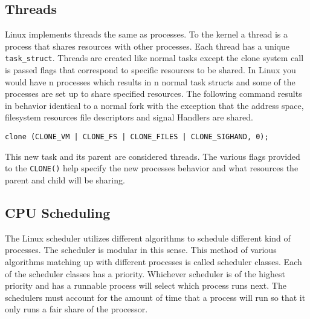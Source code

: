 \subsection{Threads}
\noindent
Linux implements threads the same as processes. To the kernel a thread is a process that shares resources with other processes. Each thread has a unique \lstinline{task_struct}. Threads are created like normal tasks except the clone system call is passed flags that correspond to specific resources to be shared. In Linux you would have n processes which results in n normal task structs and  some of the processes are set up to share specified resources. 
\newline
\newline
\noindent
The following command results in behavior identical to a normal fork with the exception that the address space, filesystem resources file descriptors and signal Handlers are shared. 
\begin{lstlisting}
clone (CLONE_VM | CLONE_FS | CLONE_FILES | CLONE_SIGHAND, 0);
\end{lstlisting}
This new task and its parent are considered threads. The various flags provided to the \lstinline{CLONE()} help specify the new processes behavior and what resources the parent and child will be sharing.\cite{LinuxTextbook}

\subsection{CPU Scheduling}
\noindent
The Linux scheduler utilizes different algorithms to schedule different kind of processes. The scheduler is modular in this sense. This method of various algorithms matching up with different processes is called scheduler classes. Each of the scheduler classes has a priority. Whichever scheduler is of the highest priority and has a runnable process will select which process runs next. The schedulers must account for the amount of time that a process will run so that it only runs a fair share of the processor.   



